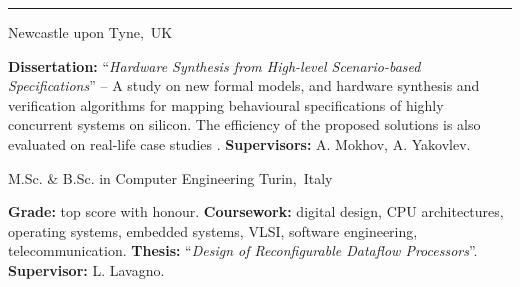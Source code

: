 \vspace{-3mm}
\rule{\textwidth}{0.5pt}\vspace{-1mm}

\begin{cventries}
\vspace{-5mm}

\cventry
{} %
{} %
{\vspace{-9mm}\normalcolor Newcastle upon Tyne,~UK} %
{} %
{ %
\begin{cvitems}
\textbf{Dissertation:} ``\textit{Hardware Synthesis from High-level 
Scenario-based 
Specifications}'' -- A study on new formal models, and hardware synthesis and 
verification algorithms for mapping behavioural specifications of highly 
concurrent systems on silicon. The efficiency of the proposed solutions is also 
evaluated on real-life case studies .
\textbf{Supervisors:} A. Mokhov, A. Yakovlev.
\end{cvitems}
}
\vspace{-4mm}

\cventry
{}
{\vspace{-9mm}M.Sc. \& B.Sc. in Computer Engineering }
{\vspace{-9mm} \normalcolor Turin,~Italy}
{}
{
\begin{cvitems}
\textbf{Grade:} top score with honour. \textbf{Coursework:} 
digital design, CPU architectures, operating systems, embedded systems, VLSI,
software engineering, telecommunication. \textbf{Thesis:} 
``\emph{Design of Reconfigurable Dataflow Processors}''. \textbf{Supervisor:} 
L. Lavagno.
\end{cvitems}
}


\end{cventries}
